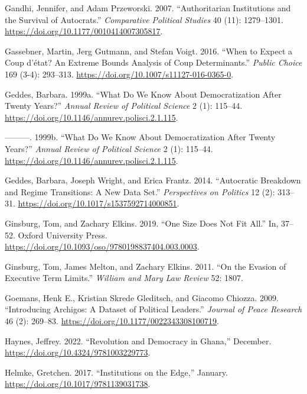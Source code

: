 \documentclass[
  12pt,
]{report}
\newlength{\cslhangindent}
\newenvironment{CSLReferences}[2] %
 {\begin{list}{}{%
  \setlength{\itemindent}{0pt}
  \setlength{\leftmargin}{0pt}
  \setlength{\parsep}{0pt}
  \ifodd #1
   \setlength{\leftmargin}{\cslhangindent}
   \setlength{\itemindent}{-1\cslhangindent}
  \fi
  \setlength{\itemsep}{#2\baselineskip}}}
 {\end{list}}
\begin{document}
\begin{CSLReferences}{1}{0}
Gandhi, Jennifer, and Adam Przeworski. 2007. {``Authoritarian
Institutions and the Survival of Autocrats.''} \emph{Comparative
Political Studies} 40 (11): 1279--1301.
\url{https://doi.org/10.1177/0010414007305817}.

Gassebner, Martin, Jerg Gutmann, and Stefan Voigt. 2016. {``When to
Expect a Coup d{'}état? An Extreme Bounds Analysis of Coup
Determinants.''} \emph{Public Choice} 169 (3-4): 293--313.
\url{https://doi.org/10.1007/s11127-016-0365-0}.

Geddes, Barbara. 1999a. {``What Do We Know About Democratization After
Twenty Years?''} \emph{Annual Review of Political Science} 2 (1):
115--44. \url{https://doi.org/10.1146/annurev.polisci.2.1.115}.

---------. 1999b. {``What Do We Know About Democratization After Twenty
Years?''} \emph{Annual Review of Political Science} 2 (1): 115--44.
\url{https://doi.org/10.1146/annurev.polisci.2.1.115}.

Geddes, Barbara, Joseph Wright, and Erica Frantz. 2014. {``Autocratic
Breakdown and Regime Transitions: A New Data Set.''} \emph{Perspectives
on Politics} 12 (2): 313--31.
\url{https://doi.org/10.1017/s1537592714000851}.

Ginsburg, Tom, and Zachary Elkins. 2019. {``One Size Does Not Fit
All.''} In, 37--52. Oxford University Press.
\url{https://doi.org/10.1093/oso/9780198837404.003.0003}.

Ginsburg, Tom, James Melton, and Zachary Elkins. 2011. {``On the Evasion
of Executive Term Limits.''} \emph{William and Mary Law Review} 52:
1807.

Goemans, Henk E., Kristian Skrede Gleditsch, and Giacomo Chiozza. 2009.
{``Introducing Archigos: A Dataset of Political Leaders.''}
\emph{Journal of Peace Research} 46 (2): 269--83.
\url{https://doi.org/10.1177/0022343308100719}.

Haynes, Jeffrey. 2022. {``Revolution and Democracy in Ghana,''}
December. \url{https://doi.org/10.4324/9781003229773}.

Helmke, Gretchen. 2017. {``Institutions on the Edge,''} January.
\url{https://doi.org/10.1017/9781139031738}.


\end{CSLReferences}
\end{document}
